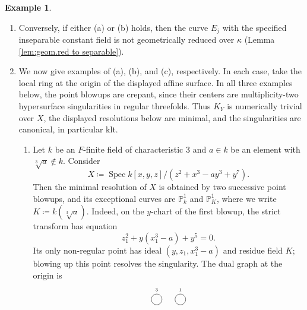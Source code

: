 \documentclass[12pt]{amsart}
\def\Spec{\operatorname{Spec}}
\def\Exc{\operatorname{Exc}}
\newcommand{\PP}{\mathbb{P}}
\theoremstyle{plain}
\theoremstyle{definition}
\newtheorem{eg}[thm]{Example}
\theoremstyle{remark}
\newtheorem{defn and notation}[thm]{Definition and Notation}
\theoremstyle{plain}
\numberwithin{equation}{thm}
\begin{document}
\begin{eg}
\begin{enumerate}[label=\textup{(\arabic*)}]
\begin{enumerate}[label=\textup{(\alph*)}]
\[\begin{tikzpicture}
\draw (A1.10)--(A2.170);
\draw (A1.-10)--(A2.190);
\draw (A2.10)--(ADot.174);
\draw (A2.-10)--(ADot.185);
\draw (ADot.5)--(A3.170);
\draw (ADot.-6)--(A3.-170);
\draw (A3)--(A4);
\draw (A4)--(ADot2);
\draw (ADot2)--(A5);
\end{tikzpicture}
\]
    \item $p=2$ and the graph of $\pi$ is a chain of length one, that is, $\Exc(\pi)$ is an irreducible curve of genus $0$.
    \[
    \begin{tikzpicture}
        \node[draw, shape=circle, inner sep=1.8pt] (A1) at (0,0){$*$};
    \end{tikzpicture}
    \]
    \end{enumerate}
    
    \item Conversely, if either \textup{(a)} or \textup{(b)} holds, then the curve $E_j$ with the specified inseparable constant field is not geometrically reduced over $\kappa$ (Lemma \ref{lem:geom.red to separable}).
\item 
We now give examples of (a), (b), and (c), respectively. In each case, take the local ring at the origin of the displayed affine surface.
In all three examples below, the point blowups are crepant, since their centers are multiplicity-two hypersurface singularities in regular threefolds. 
Thus $K_Y$ is numerically trivial over $X$, the displayed resolutions below are minimal, and the singularities are canonical, in particular klt.

\begin{enumerate}[label=\textup{(\roman*)}]
\item Let $k$ be an $F$-finite field of characteristic $3$ and $a \in k$ be an element with $ \sqrt[3]{a} \not\in k$.
Consider 
\[
X \coloneqq \Spec k[x,y,z]/(z^2+x^3-ay^3+y^7).
\] 
Then the minimal resolution of $X$ is obtained by two successive point blowups, and its exceptional curves are $\PP^1_k$ and $\PP^1_{K}$, where we write $K \coloneqq k(\sqrt[3]{a})$.
Indeed, on the $y$-chart of the first blowup, the strict transform has equation
\[
z_1^2+y(x_1^3-a)+y^5=0.
\]
Its only non-regular point has ideal $(y,z_1,x_1^3-a)$ and residue field $K$; blowing up this point resolves the singularity.
The dual graph at the origin is
    \[
    \begin{tikzpicture}
    \node[draw, shape=circle, inner sep=4.5pt] (B1) at (0,-1){};
    \draw[shift={(0,0.4)}] (0,-1) node{\tiny $3$};
    \node[draw, shape=circle, inner sep=4.5pt] (B2) at (1,-1){};
    \draw[shift={(0,0.4)}] (1,-1) node{\tiny $1$};


\end{tikzpicture}\]
\end{enumerate}
\end{enumerate}
\end{eg}
\end{document}
